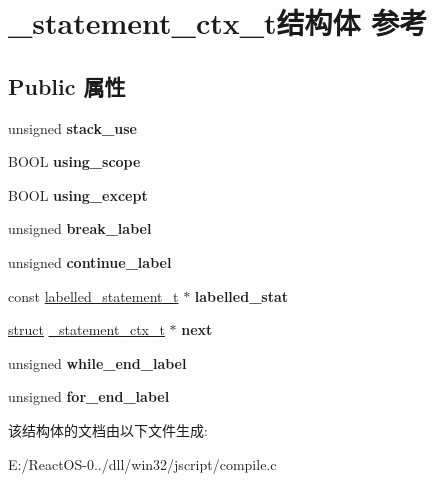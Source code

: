 \hypertarget{struct__statement__ctx__t}{}\section{\+\_\+statement\+\_\+ctx\+\_\+t结构体 参考}
\label{struct__statement__ctx__t}
\subsection*{Public 属性}
\begin{DoxyCompactItemize}
\item 
\mbox{\label{struct__statement__ctx__t_ab0005e73af9d7238a3e172cbac8e5144}} 
unsigned {\bfseries stack\+\_\+use}
\item 
\mbox{\label{struct__statement__ctx__t_a2dbd251670efe9e09bee2a0290004788}} 
B\+O\+OL {\bfseries using\+\_\+scope}
\item 
\mbox{\label{struct__statement__ctx__t_a69374e3cce059767a4d8db1523bd8b81}} 
B\+O\+OL {\bfseries using\+\_\+except}
\item 
\mbox{\label{struct__statement__ctx__t_a92d9d118df7e63145d758063b728e5df}} 
unsigned {\bfseries break\+\_\+label}
\item 
\mbox{\label{struct__statement__ctx__t_a4f969abd84b2fe7c613b3d8a0e56a996}} 
unsigned {\bfseries continue\+\_\+label}
\item 
\mbox{\label{struct__statement__ctx__t_a34a5bf66c9e182c46562b1564de9a75f}} 
const \hyperlink{structlabelled__statement__t}{labelled\+\_\+statement\+\_\+t} $\ast$ {\bfseries labelled\+\_\+stat}
\item 
\mbox{\label{struct__statement__ctx__t_adf5404eaffc3d987edbcb86e816e866e}} 
\hyperlink{interfacestruct}{struct} \hyperlink{struct__statement__ctx__t}{\+\_\+statement\+\_\+ctx\+\_\+t} $\ast$ {\bfseries next}
\item 
\mbox{\label{struct__statement__ctx__t_a78e34e66f58bd6ca59a5181bffa115ef}} 
unsigned {\bfseries while\+\_\+end\+\_\+label}
\item 
\mbox{\label{struct__statement__ctx__t_a360674b6bff54b8e6f173cee125ca58d}} 
unsigned {\bfseries for\+\_\+end\+\_\+label}
\end{DoxyCompactItemize}


该结构体的文档由以下文件生成\+:\begin{DoxyCompactItemize}
\item 
E\+:/\+React\+O\+S-\/0../dll/win32/jscript/compile.\+c\end{DoxyCompactItemize}
